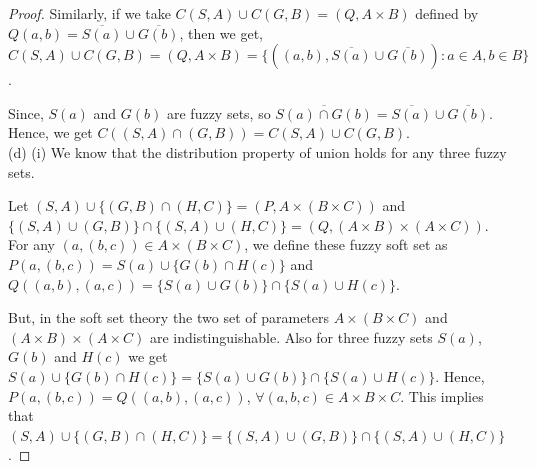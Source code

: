 \documentclass[10pt,a4paper]{amsart}
\begin{document}
\begin{proof}
Similarly, if we take $C(S,A) \cup C(G,B)=(Q, A\times B)$ defined by $Q(a,b)=\overline{S(a)} \cup \overline{G(b)}$, then we get, $C(S,A) \cup C(G,B)=(Q, A\times B)=\{((a, b), \overline{S(a)}\cup \overline{G(b)}): a\in A, b\in B\}$.


 Since, $S(a)$ and $G(b)$ are fuzzy sets, so $\overline{S(a)\cap G(b)}=\overline{S(a)}\cup \overline{G(b)}$. Hence, we get $C((S,A) \cap (G,B)) = C(S,A) \cup C(G,B)$.\\

(d) (i) We know that the distribution property of union holds for any three fuzzy sets. 


 Let $(S, A)\cup \{(G, B) \cap (H,C)\}=(P, A\times(B\times C))$ and $\{(S, A) \cup (G,B)\} \cap \{(S, A) \cup (H,C)\}=(Q,(A\times B)\times (A\times C))$. For any $(a, (b, c))\in A\times (B\times C)$, we define these fuzzy soft set as $P(a,(b,c))=S(a)\cup\{G(b)\cap H(c)\}$ and $Q((a,b),(a,c))=\{S(a)\cup G(b)\}\cap \{S(a)\cup H(c)\}$.

 
 But, in the soft set theory the two set of parameters $A\times(B\times C)$ and $(A\times B)\times (A\times C)$ are indistinguishable. Also for three fuzzy sets $S(a)$, $G(b)$ and $H(c)$ we get $S(a)\cup\{G(b)\cap H(c)\}=\{S(a)\cup G(b)\}\cap \{S(a)\cup H(c)\}$. Hence, $P(a,(b,c))=Q((a,b),(a,c))$, $\forall (a,b,c)\in A\times B\times C$. This implies that $(S,A)\cup \{(G,B) \cap (H,C)\} = \{(S,A) \cup (G,B)\} \cap \{(S,A) \cup (H,C)\}$.
    
\end{proof}
\end{document}
